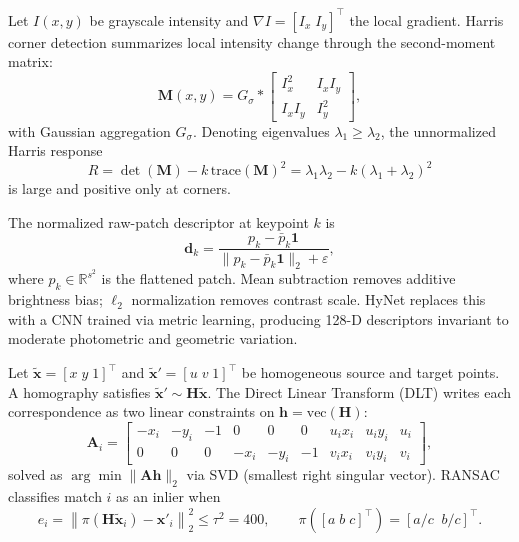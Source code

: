 {Let $I(x,y)$ be grayscale intensity and $\nabla I = [I_x\;I_y]^\top$ the local
gradient.  Harris corner detection summarizes local intensity change through the
second-moment matrix:
\begin{equation}
  \mathbf{M}(x,y)
  = G_\sigma \ast
  \begin{bmatrix} I_x^2 & I_xI_y \\ I_xI_y & I_y^2 \end{bmatrix},
  \label{eq:structure_tensor}
\end{equation}
with Gaussian aggregation $G_\sigma$.  Denoting eigenvalues $\lambda_1 \ge \lambda_2$,
the unnormalized Harris response
\begin{equation}
  R = \det(\mathbf{M}) - k\,\mathrm{trace}(\mathbf{M})^2
    = \lambda_1\lambda_2 - k(\lambda_1+\lambda_2)^2
  \label{eq:harris_response}
\end{equation}
is large and positive only at corners.

The normalized raw-patch descriptor at keypoint $k$ is
\begin{equation}
  \mathbf{d}_k
  = \frac{p_k - \bar{p}_k\mathbf{1}}
         {\|p_k - \bar{p}_k\mathbf{1}\|_2 + \varepsilon},
  \label{eq:patch_descriptor}
\end{equation}
where $p_k \in \mathbb{R}^{s^2}$ is the flattened patch.  Mean subtraction
removes additive brightness bias; $\ell_2$ normalization removes contrast scale.
HyNet replaces this with a CNN trained via metric learning, producing 128-D
descriptors invariant to moderate photometric and geometric variation.

Let $\tilde{\mathbf{x}} = [x\;y\;1]^\top$ and $\tilde{\mathbf{x}}' = [u\;v\;1]^\top$
be homogeneous source and target points.  A homography satisfies
$\tilde{\mathbf{x}}' \sim \mathbf{H}\tilde{\mathbf{x}}$.
The Direct Linear Transform (DLT) writes each correspondence as two linear
constraints on $\mathbf{h} = \mathrm{vec}(\mathbf{H})$:
\begin{equation}
  \mathbf{A}_i =
  \begin{bmatrix}
    -x_i & -y_i & -1 & 0 & 0 & 0 & u_i x_i & u_i y_i & u_i \\
     0   &  0   &  0 & -x_i & -y_i & -1 & v_i x_i & v_i y_i & v_i
  \end{bmatrix},
  \label{eq:dlt}
\end{equation}
solved as $\arg\min \|\mathbf{A}\mathbf{h}\|_2$ via SVD (smallest right singular
vector).  RANSAC classifies match $i$ as an inlier when
\begin{equation}
  e_i = \left\| \pi(\mathbf{H}\tilde{\mathbf{x}}_i) - \mathbf{x}'_i \right\|_2^2
  \le \tau^2 = 400,
  \qquad
  \pi\!\left([a\;b\;c]^\top\right) = [a/c\;\;b/c]^\top.
  \label{eq:reprojection}
\end{equation}

}
